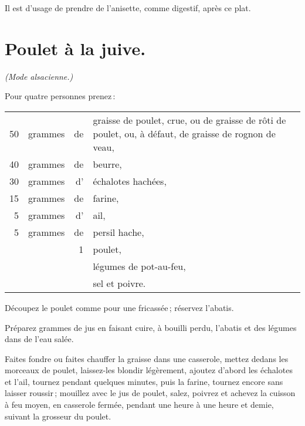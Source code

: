 Il est d'usage de prendre de l'anisette, comme digestif, après ce plat.

\section*{\centering Poulet à la juive.}
{}

\centering\textit{(Mode alsacienne.)}

\bigskip

\justifying
Pour quatre personnes prenez :

\medskip

\footnotesize
\begin{longtable}{rrrp{16em}}
     50 & grammes & de & graisse de poulet, crue, ou de graisse de rôti de poulet,
                         ou, à défaut, de graisse de rognon de veau,                                      \\
     40 & grammes & de & beurre,                                                                          \\
     30 & grammes & d’ & échalotes hachées,                                                               \\
     15 & grammes & de & farine,                                                                          \\
      5 & grammes & d' & ail,                                                                             \\
      5 & grammes & de & persil hache,                                                                    \\
        &         &  1 & poulet,                                                                          \\
        &         &    & légumes de pot-au-feu,                                                           \\
        &         &    & sel et poivre.                                                                   \\
\end{longtable}
\normalsize

Découpez le poulet comme pour une fricassée ; réservez l'abatis.

Préparez {\mmm} grammes de jus en faisant cuire, à bouilli perdu,
l'abatis et des légumes dans de l'eau salée.

Faites fondre ou faites chauffer la graisse dans une casserole, mettez dedans
les morceaux de poulet, laissez-les blondir légèrement, ajoutez d'abord les
échalotes et l'ail, tournez pendant quelques minutes, puis la farine, tournez
encore sans laisser roussir ; mouillez avec le jus de poulet, salez, poivrez et
achevez la cuisson à feu moyen, en casserole fermée, pendant une heure à une
heure et demie, suivant la grosseur du poulet.

